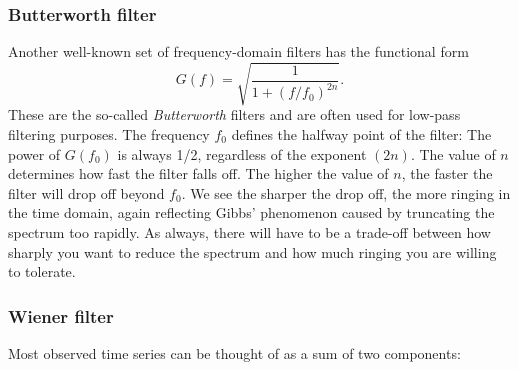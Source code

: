\subsubsection{Butterworth filter}
	Another well-known set of frequency-domain filters has the functional form
\begin{equation}
G(f) = \sqrt{\frac{1}{1 + (f/f_0) ^{2n}} }.
\end{equation}
These are the so-called \emph{Butterworth} filters and are often used for low-pass filtering purposes.
The frequency $f_0$ defines the halfway point of the filter: The power of $G(f_0)$ is always 1/2,
regardless of the exponent $(2n)$. The value of $n$ determines how fast the filter falls off.
The higher the value of $n$, the faster the filter will drop off beyond $f_0$.
We see the sharper the drop off, the more ringing in the time domain, again reflecting Gibbs'
phenomenon caused by truncating the spectrum too rapidly. As always, there will have
to be a trade-off between how sharply you want to reduce the spectrum and how much
ringing you are willing to tolerate.\\

\subsubsection{Wiener filter}
\label{sec:Wiener}
Most observed time series can be thought of as a sum of two components:

